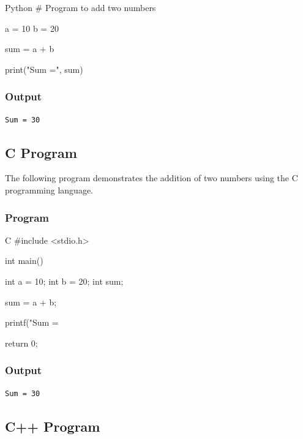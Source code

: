 \begin{code}{Python}
# Program to add two numbers

a = 10
b = 20

sum = a + b

print("Sum =", sum)
\end{code}

\subsubsection{Output}

\begin{verbatim}
Sum = 30
\end{verbatim}



\subsection{C Program}

The following program demonstrates the addition of two numbers
using the C programming language.

\subsubsection{Program}

\begin{code}{C}
#include <stdio.h>

int main()
{
    int a = 10;
    int b = 20;
    int sum;

    sum = a + b;

    printf("Sum = %

    return 0;
}
\end{code}

\subsubsection{Output}

\begin{verbatim}
Sum = 30
\end{verbatim}



\subsection{C++ Program}

